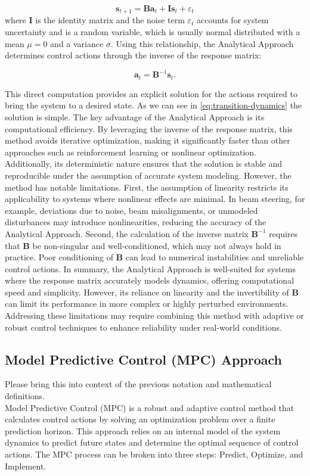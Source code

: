 \documentclass[journal,article,submit,pdftex,moreauthors]{Definitions/mdpi}
\begin{document}
\begin{equation}
	\mathbf{s}_{t+1} = \mathbf{B} \mathbf{a}_t + \mathbf{I} \mathbf{s}_t + \varepsilon_t \label{eq:transition-dynamics}
\end{equation}
where $\mathbf{I}$ is the identity matrix and the noise term $ \varepsilon_t$ accounts for system uncertainty and is a random variable, which is usually normal distributed with a mean $\mu=0$ and a variance $\sigma$. Using this relationship, the Analytical Approach determines control actions through the inverse of the response matrix:

\begin{equation}
\mathbf{a}_t = \mathbf{B}^{-1} \mathbf{s}_t. \label{eq:inverse_response_policy}
\end{equation}

This direct computation provides an explicit solution for the actions required to bring the system to a desired state.
As we can see in \cref{eq:transition-dynamics} the solution is simple.
The key advantage of the Analytical Approach is its computational efficiency. By leveraging the inverse of the response matrix, this method avoids iterative optimization, making it significantly faster than other approaches such as reinforcement learning or nonlinear optimization. Additionally, its deterministic nature ensures that the solution is stable and reproducible under the assumption of accurate system modeling. However, the method has notable limitations. First, the assumption of linearity restricts its applicability to systems where nonlinear effects are minimal. In beam steering, for example, deviations due to noise, beam misalignments, or unmodeled disturbances may introduce nonlinearities, reducing the accuracy of the Analytical Approach. Second, the calculation of the inverse matrix $\mathbf{B}^{-1}$ requires that $\mathbf{B}$ be non-singular and well-conditioned, which may not always hold in practice. Poor conditioning of $\mathbf{B}$ can lead to numerical instabilities and unreliable control actions.
In summary, the Analytical Approach is well-suited for systems where the response matrix accurately models dynamics, offering computational speed and simplicity. However, its reliance on linearity and the invertibility of $\mathbf{B}$ can limit its performance in more complex or highly perturbed environments. Addressing these limitations may require combining this method with adaptive or robust control techniques to enhance reliability under real-world conditions.
\subsection{Model Predictive Control (MPC) Approach}
Please bring this into context of the previous notation and mathematical definitions.\\
Model Predictive Control (MPC) is a robust and adaptive control method that calculates control actions by solving an optimization problem over a finite prediction horizon. This approach relies on an internal model of the system dynamics to predict future states and determine the optimal sequence of control actions. The MPC process can be broken into three steps: Predict, Optimize, and Implement.
\end{document}
